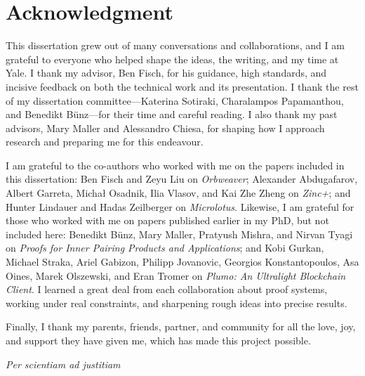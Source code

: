 \chapter*{Acknowledgment} 

This dissertation grew out of many conversations and collaborations, and I am grateful to everyone who helped shape the ideas, the writing, and my time at Yale. I thank my advisor, Ben Fisch, for his guidance, high standards, and incisive feedback on both the technical work and its presentation. I thank the rest of my dissertation committee—Katerina Sotiraki, Charalampos Papamanthou, and Benedikt Bünz—for their time and careful reading. I also thank my past advisors, Mary Maller and Alessandro Chiesa, for shaping how I approach research and preparing me for this endeavour.

I am grateful to the co-authors who worked with me on the papers included in this dissertation: Ben Fisch and Zeyu Liu on \emph{Orbweaver}; Alexander Abdugafarov, Albert Garreta, Michał Osadnik, Ilia Vlasov, and Kai Zhe Zheng on \emph{Zinc+}; and Hunter Lindauer and Hadas Zeilberger on \emph{Microlotus}. Likewise, I am grateful for those who worked with me on papers published earlier in my PhD, but not included here: Benedikt Bünz, Mary Maller, Pratyush Mishra, and Nirvan Tyagi on \emph{Proofs for Inner Pairing Products and Applications}; and Kobi Gurkan, Michael Straka, Ariel Gabizon, Philipp Jovanovic, Georgios Konstantopoulos, Asa Oines, Marek Olszewski, and Eran Tromer on \emph{Plumo: An Ultralight Blockchain Client}. I learned a great deal from each collaboration about proof systems, working under real constraints, and sharpening rough ideas into precise results.

Finally, I thank my parents, friends, partner, and community for all the love, joy, and support they have given me, which has made this project possible.

\vspace*{\fill}
\begin{center}
\emph{Per scientiam ad justitiam}
\end{center}
\vspace*{\fill}